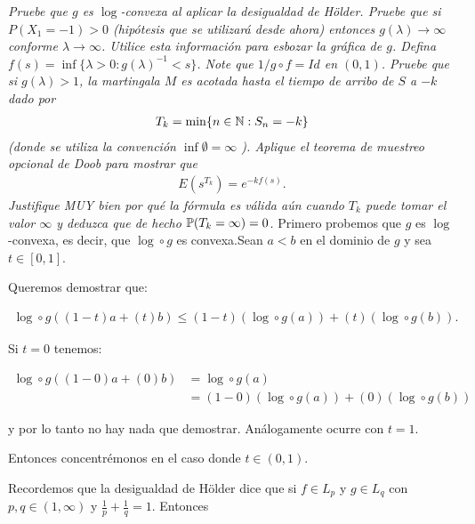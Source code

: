 \emph{
    Pruebe que $g$ es $\log$-convexa al aplicar la desigualdad de H\"older. Pruebe que si $P(X_1=-1)>0$ (hip\'otesis que se utilizar\'a desde ahora) 
    entonces $g(\lambda)\to\infty$ conforme $\lambda\to\infty$. Utilice esta informaci\'on para esbozar la gr\'afica de $g$. 
    Defina $ f(s)=\inf \{ \lambda>0:g(\lambda)^{-1} < s\} $. Note que $1/g\circ f=Id$ en $(0,1)$. Pruebe que si $g(\lambda)>1$, 
    la martingala $M$ es acotada hasta el tiempo de arribo de $S$ a $-k$ dado por 
    \null
    \begin{align}
        T_k =\min \{n\in\mathbb{N}:S_n=-k\} 
    \end{align}
    \null
    (donde se utiliza la convenci\'on $\inf\emptyset=\infty$ ). Aplique el teorema de muestreo opcional de Doob para mostrar que 
    \null
    \begin{align}
        E(s^{T_k})=e^{-k f(s)}.
    \end{align}
    \null
    Justifique MUY bien por qu\'e la f\'ormula es válida aún cuando $T_k$ puede tomar el valor $\infty$ y deduzca que de hecho 
    $ \mathbb{P}  (T_k=\infty)=0$.
}
\afterstatement
    Primero probemos que $g$ es $\log$-convexa, es decir, que $\log \circ g$ es convexa.Sean $a < b$ en el dominio de $g$ 
    y sea $t \in [0, 1]$.\par\null
    
    Queremos demostrar que:
    
    \begin{align}
            \log\circ g ((1-t)a + (t)b) \leq (1-t)(\log\circ g (a)) + (t)(\log\circ g (b)).
    \end{align}
    
    Si $t=0$ tenemos:
    
    \begin{align}
        \log\circ g ((1-0)a + (0)b)     &= \log\circ g (a) \\
                                        &= (1-0)(\log\circ g (a)) + (0)(\log\circ g (b))
    \end{align}
    
    y por lo tanto no hay nada que demostrar. Análogamente ocurre con $t=1$.\par\null
    
    Entonces concentrémonos en el caso donde $t\in (0, 1)$.\par\null
    
    Recordemos que la desigualdad de Hölder dice que si $f \in L_p$ y $g \in L_q$ con 
    $p,q \in (1,\infty)$ y $\frac{1}{p} + \frac{1}{q} = 1$. Entonces
                
